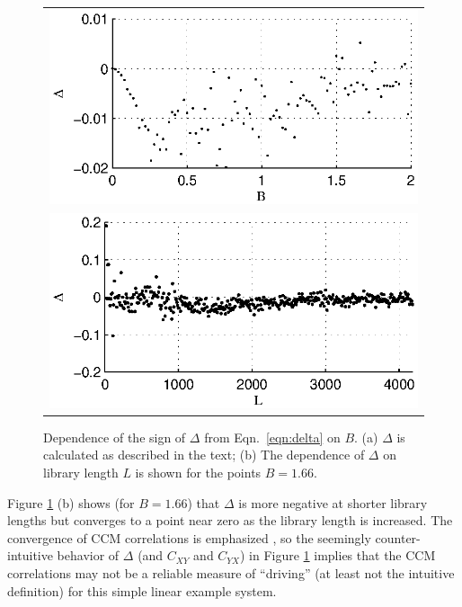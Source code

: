 \documentclass[twocolumn,aps,pre,groupedaddress]{revtex4-1}
\begin{document}
\begin{figure}[ht]
\begin{tabular}{l}
\includegraphics[scale=0.8]{LinearEx.eps} \\
\includegraphics[scale=0.8]{LinearExChangeL.eps} \\
\end{tabular}
\caption{Dependence of the sign of $\Delta$ from Eqn.\ \ref{eqn:delta} on $B$. (a) $\Delta$ is calculated as described in the text; (b) The dependence of $\Delta$ on library length $L$ is shown for the points $B = 1.66$.}
\label{fig:linearex1}
\end{figure}

Figure \ref{fig:linearex1} (b) shows (for $B = 1.66$) that $\Delta$ is more negative at shorter library lengths but converges to a point near zero as the library length is increased.  The convergence of CCM correlations is emphasized \cite{Sugihara2012}, so the seemingly counter-intuitive behavior of $\Delta$ (and $C_{XY}$ and $C_{YX}$) in Figure \ref{fig:linearex1} implies that the CCM correlations may not be a reliable measure of ``driving'' (at least not the intuitive definition) for this simple linear example system.
\end{document}
